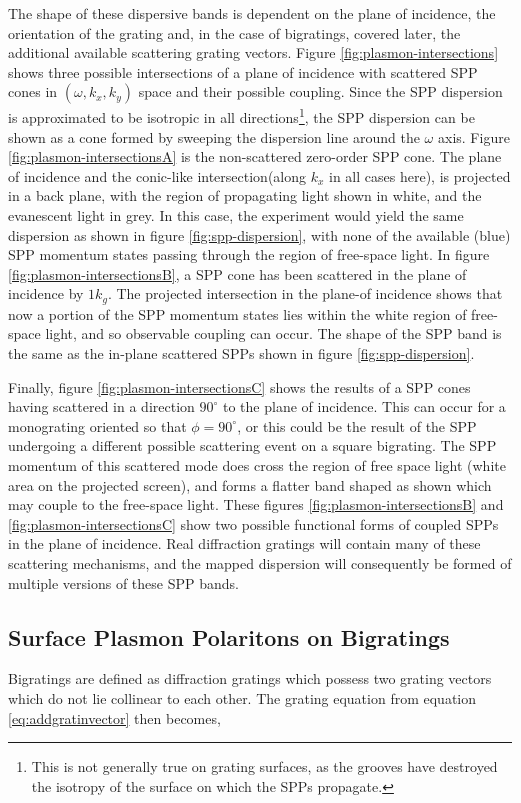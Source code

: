 The shape of these dispersive bands is dependent on the plane of incidence, the orientation of the grating and, in the case of bigratings, covered later, the additional available scattering grating vectors. Figure \ref{fig:plasmon-intersections} shows three possible intersections of a plane of incidence with scattered SPP cones in $(\omega, k_x, k_y)$ space and their possible coupling. Since the SPP dispersion is approximated to be isotropic in all directions\footnote{This is not generally true on grating surfaces, as the grooves have destroyed the isotropy of the surface on which the SPPs propagate.}, the SPP dispersion can be shown as a cone formed by sweeping the dispersion line around the $\omega$ axis. Figure \ref{fig:plasmon-intersectionsA} is the non-scattered zero-order SPP cone. The plane of incidence and the conic-like intersection(along $k_x$ in all cases here), is projected in a back plane, with the region of propagating light shown in white, and the evanescent light in grey. In this case, the experiment would yield the same dispersion as shown in figure \ref{fig:spp-dispersion}, with none of the available (blue) SPP momentum states passing through the region of free-space light. In figure \ref{fig:plasmon-intersectionsB}, a SPP cone has been scattered in the plane of incidence by $1k_g$. The projected intersection in the plane-of incidence shows that now a portion of the SPP momentum states lies within the white region of free-space light, and so observable coupling can occur. The shape of the SPP band is the same as the in-plane scattered SPPs shown in figure \ref{fig:spp-dispersion}. 

Finally, figure \ref{fig:plasmon-intersectionsC} shows the results of a SPP cones having scattered in a direction $90^\circ$ to the plane of incidence. This can occur for a monograting oriented so that $\phi=90^\circ$, or this could be the result of the SPP undergoing a different possible scattering event on a square bigrating. The SPP momentum of this scattered mode does cross the region of free space light (white area on the projected screen), and forms a flatter band shaped as shown which may couple to the free-space light. These figures \ref{fig:plasmon-intersectionsB} and \ref{fig:plasmon-intersectionsC} show two possible functional forms of coupled SPPs in the plane of incidence. Real diffraction gratings will contain many of these scattering mechanisms, and the mapped dispersion will consequently be formed of multiple versions of these SPP bands.

\subsection{Surface Plasmon Polaritons on Bigratings}
Bigratings are defined as diffraction gratings which possess two grating vectors which do not lie collinear to each other. The grating equation from equation \ref{eq:addgratinvector} then becomes,

